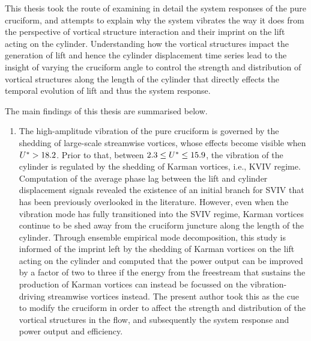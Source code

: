 \documentclass[oneside]{utmthesis}
\begin{document}
This thesis took the route of examining in detail the system responses of the pure cruciform, and attempts to explain why the system vibrates the way it does from the perspective of vortical structure interaction and their imprint on the lift acting on the cylinder. Understanding how the vortical structures impact the generation of lift and hence the cylinder displacement time series lead to the insight of varying the cruciform angle to control the strength and distribution of vortical structures along the length of the cylinder that directly effects the temporal evolution of lift and thus the system response.

\noindent The main findings of this thesis are summarised below.

\begin{enumerate}
  \item The high-amplitude vibration of the pure cruciform is governed by the shedding of large-scale streamwise vortices, whose effects become visible when $U^{*} > 18.2$. Prior to that, between $2.3 \leq U^{*} \leq 15.9$, the vibration of the cylinder is regulated by the shedding of Karman vortices, i.e., KVIV regime. Computation of the average phase lag between the lift and cylinder displacement signals revealed the existence of an initial branch for SVIV that has been previously overlooked in the literature. However, even when the vibration mode has fully transitioned into the SVIV regime, Karman vortices continue to be shed away from the cruciform juncture along the length of the cylinder. Through ensemble empirical mode decomposition, this study is informed of the imprint left by the shedding of Karman vortices on the lift acting on the cylinder and computed that the power output can be improved by a factor of two to three if the energy from the freestream that sustains the production of Karman vortices can instead be focussed on the vibration-driving streamwise vortices instead. The present author took this as the cue to modify the cruciform in order to affect the strength and distribution of the vortical structures in the flow, and subsequently the system response and power output and efficiency.


\end{enumerate}
\end{document}
